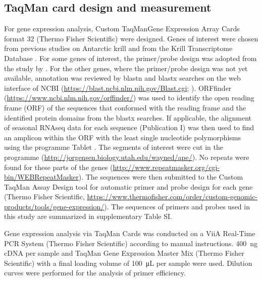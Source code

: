 \subsection{TaqMan card design and measurement}

For gene expression analysis, Custom TaqMan\texttrademark Gene Expression Array
Cards format 32 (Thermo Fisher Scientific) were designed. Genes of interest
were chosen from previous studies on Antarctic krill \citep[and Höring et al.,
in prep]{piccolin_seasonal_2018} and from the Krill Transcriptome Database
\citep{sales_krilldb:_2017}. For some genes of interest, the primer/probe
design was adopted from the study by \citet{piccolin_seasonal_2018}. For the
other genes, where the primer/probe design was not yet available, annotation
was reviewed by blastn and blastx searches on the web interface of NCBI
(\url{https://blast.ncbi.nlm.nih.gov/Blast.cgi}; \citet{johnson_ncbi_2008}).
ORFfinder (\url{https://www.ncbi.nlm.nih.gov/orffinder/}) was used to identify
the open reading frame (ORF) of the sequences that conformed with the reading
frame and the identified protein domains from the blastx searches. If
applicable, the alignment of seasonal RNAseq data for each sequence
(Publication I) was then used to find an amplicon within the ORF with the least
single nucleotide polymorphisms using the programme Tablet
\citep{milne_tabletnext_2010}. The segments of interest were cut in the
programme  (\url{http://jorgensen.biology.utah.edu/wayned/ape/}).
No repeats were found for these parts of the genes
(\url{http://www.repeatmasker.org/cgi-bin/WEBRepeatMasker}).  The sequences
were then submitted to the Custom TaqMan\textsuperscript{\textregistered} Assay
Design tool for automatic primer and probe design for each gene (Thermo Fisher
Scientific,
\url{https://www.thermofisher.com/order/custom-genomic-products/tools/gene-expression/}).
The sequences of primers and probes used in this study are summarized in
supplementary Table SI. 


Gene expression analysis via TaqMan\textsuperscript{\textregistered} Cards was
conducted on a ViiA Real-Time PCR System (Thermo Fisher
Scientific) according to manual instructions. \SI{400}{\nano\gram} cDNA per
sample and TaqMan\textsuperscript{\textregistered} Gene Expression Master Mix
(Thermo Fisher Scientific) with a final loading volume of
\SI{100}{\micro\liter} per sample were used.  Dilution curves were performed
for the analysis of primer efficiency. 

